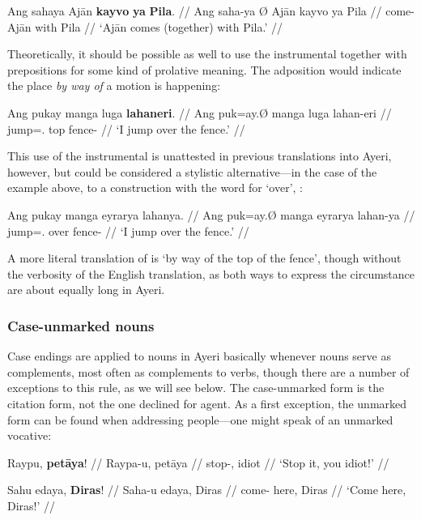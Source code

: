 \ex\begingl
	\gla Ang sahaya {} Ajān \textbf{kayvo} \textbf{ya} \textbf{Pila}. //
	\glb Ang saha-ya Ø Ajān kayvo ya Pila //
	\glc \AgtT{} come-\TsgM{} \Top{} Ajān with \Loc{} Pila //
	\glft `Ajān comes (together) with Pila.' //
\endgl\xe

Theoretically, it should be possible as well to use the instrumental together 
with prepositions for some kind of prolative meaning. The adposition would 
indicate the place \emph{by way of} a motion is happening:

\ex\begingl
	\gla Ang pukay manga luga \textbf{lahaneri}. //
	\glb Ang puk=ay.Ø manga luga lahan-eri //
	\glc \AgtT{} jump=\Fsg{}.\Top{} \Dyn{} top fence-\Ins{} //
	\glft `I jump over the fence.' //
\endgl\xe

This use of the instrumental is unattested in previous translations into Ayeri,
however, but could be considered a stylistic alternative---in the case of the
example above, to a construction with the word for `over',
:

\ex\begingl
	\gla Ang pukay manga eyrarya lahanya. //
	\glb Ang puk=ay.Ø manga eyrarya lahan-ya //
	\glc \AgtT{} jump=\Fsg{}.\Top{} \Dyn{} over fence-\Loc{} //
	\glft `I jump over the fence.' //
\endgl\xe

A more literal translation of  is `by
way of the top of the fence', though without the verbosity of the English
translation, as both ways to express the circumstance are about equally long in
Ayeri.


\subsubsection{Case-unmarked nouns}
\label{subsec:uncased}

Case endings are applied to nouns in Ayeri basically whenever nouns serve as
complements, most often as complements to verbs, though there are a number of
exceptions to this rule, as we will see below. The case-unmarked form is the
citation form, not the one declined for agent. As a first exception, the
unmarked form can be found when addressing people---one might speak of an
unmarked vocative:

\pex
\a\label{ex:vocnoun}\begingl
	\gla Raypu, \textbf{petāya}! //
	\glb Raypa-u, petāya //
	\glc stop-\Imp{}, idiot //
	\glft `Stop it, you idiot!' //
\endgl

\a\label{ex:vocname}\begingl
	\gla Sahu edaya, \textbf{Diras}! //
	\glb Saha-u edaya, Diras //
	\glc come-\Imp{} here, Diras //
	\glft `Come here, Diras!' //
\endgl
\xe

